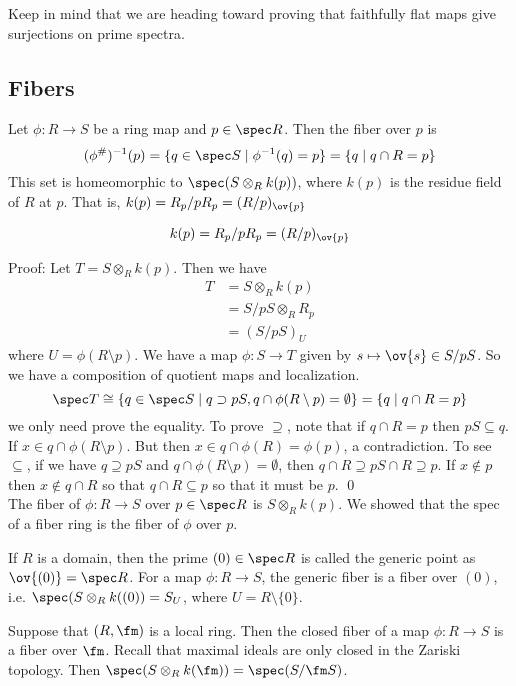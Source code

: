 Keep in mind that we are heading toward proving that faithfully flat maps give surjections on prime spectra. 

\subsection{Fibers}

Let $\phi: R \to S$ be a ring map and $p \in \spec R$. Then the fiber over $p$ is
\[
(\phi^\#)^{-1}(p)=\{q \in \spec S \;|\; \phi^{-1}(q)=p\}=\{q \;|\; q \cap R=p\}
\]
This set is homeomorphic to $\spec(S \otimes_R k(p))$, where $k(p)$ is the residue field of $R$ at $p$. That is, $k(p)=R_p/pR_p=(R/p)_{\ov{p}}$

\begin{prop}
\[
k(p)=R_p/pR_p=(R/p)_{\ov{p}}
\]
\end{prop}

\noindent Proof: Let $T=S \otimes_R k(p)$. Then we have
\[
\begin{split}
T&=S \otimes_R k(p) \\
&=S/pS \otimes_R R_p \\
&=(S/pS)_U
\end{split}
\]
where $U=\phi(R\setminus p)$. We have a map $\phi: S \to T$ given by $s \mapsto \ov{s} \in S/pS$. So we have a composition of quotient maps and localization. 
\[
\spec T \cong\{q \in \spec S\;|\; q \supset pS, q \cap \phi(R\setminus p)=\emptyset\}=\{q \;|\; q \cap R=p\}
\]
we only need prove the equality. To prove $\supseteq$, note that if $q \cap R=p$ then $pS \subseteq q$. If $x \in q \cap \phi(R \setminus p)$. But then $x \in q \cap \phi(R)=\phi(p)$, a contradiction. To see $\subseteq$, if we have $q \supseteq pS$ and $q \cap \phi(R \setminus p)=\emptyset$, then $q \cap R \supseteq pS \cap R \supseteq p$. If $x \notin p$ then $x \notin q \cap R$ so that $q \cap R \subseteq p$ so that it must be $p$. \qed \\

The fiber of $\phi: R \to S$ over $p \in \spec R$ is $S \otimes_R k(p)$. We showed that the spec of a fiber ring is the fiber of $\phi$ over $p$. 

\begin{ex}
If $R$ is a domain, then the prime $(0) \in \spec R$ is called the generic point as $\ov{(0)}=\spec R$. For a map $\phi: R \to S$, the generic fiber is a fiber over $(0)$, i.e. $\spec(S \otimes_R k((0))=S_U$, where $U=R \setminus\{0\}$. 
\end{ex}

\begin{ex}
Suppose that $(R,\fm)$ is a local ring. Then the closed fiber of a map $\phi: R \to S$ is a fiber over $\fm$. Recall that maximal ideals are only closed in the Zariski topology. Then $\spec(S \otimes_R k(\fm))=\spec(S/\fm S)$.
\end{ex}

